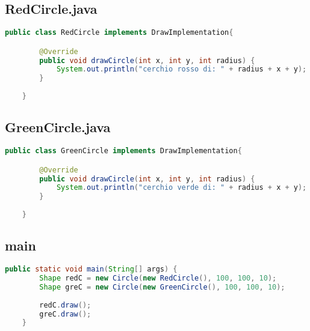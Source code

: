 \subsection{RedCircle.java}
\begin{lstlisting}[language=java]
    public class RedCircle implements DrawImplementation{

        @Override
        public void drawCircle(int x, int y, int radius) {
            System.out.println("cerchio rosso di: " + radius + x + y);    
        }
        
    }
\end{lstlisting}

\subsection{GreenCircle.java}
\begin{lstlisting}[language=java]
    public class GreenCircle implements DrawImplementation{

        @Override
        public void drawCircle(int x, int y, int radius) {
            System.out.println("cerchio verde di: " + radius + x + y);    
        }
        
    }
\end{lstlisting}

\subsection{main}
\begin{lstlisting}[language=java]
    public static void main(String[] args) {
        Shape redC = new Circle(new RedCircle(), 100, 100, 10);
        Shape greC = new Circle(new GreenCircle(), 100, 100, 10);
    
        redC.draw();
        greC.draw();
    }
\end{lstlisting}